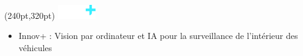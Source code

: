 \begin{textblock*}{1cm}(240pt,320pt)
  \colorbox{innov-plus-color}{\includegraphics[height=0.6cm]{images/logo-innov-plus.png}}
\end{textblock*}
\begin{itemize}
    \item Innov+ : Vision par ordinateur et IA pour la surveillance de l'intérieur des véhicules
\end{itemize}
